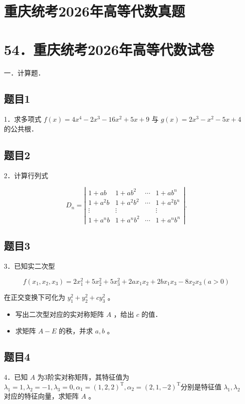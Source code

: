 \documentclass{article}
\begin{document}
\section*{重庆统考2026年高等代数真题}
\section*{54．重庆统考2026年高等代数试卷}
一．计算题．\\

\subsection{题目1}
1．求多项式 \(f(x)=4 x^{4}-2 x^{3}-16 x^{2}+5 x+9\) 与 \(g(x)=2 x^{3}-x^{2}-5 x+4\) 的公共根．

\subsection{题目2}
2．计算行列式

\[
D_{n}=\left|\begin{array}{cccc}
1+a b & 1+a b^{2} & \cdots & 1+a b^{n} \\
1+a^{2} b & 1+a^{2} b^{2} & \cdots & 1+a^{2} b^{n} \\
\vdots & \vdots & & \vdots \\
1+a^{n} b & 1+a^{n} b^{2} & \cdots & 1+a^{n} b^{n}
\end{array}\right| .
\]

\subsection{题目3}
3．已知实二次型

\[
f\left(x_{1}, x_{2}, x_{3}\right)=2 x_{1}^{2}+5 x_{2}^{2}+5 x_{3}^{2}+2 a x_{1} x_{2}+2 b x_{1} x_{3}-8 x_{2} x_{3}(a>0)
\]

在正交变换下可化为 \(y_{1}^{2}+y_{2}^{2}+c y_{3}^{2}\) 。

\begin{itemize}
  \item[（1）] 写出二次型对应的实对称矩阵 \(A\) ，给出 \(c\) 的值．
  \item[（2）] 求矩阵 \(A-E\) 的秩，并求 \(a, b\) 。
\end{itemize}

\subsection{题目4}
4．已知 \(A\) 为3阶实对称矩阵，其特征值为 \(\lambda_{1}=1, \lambda_{2}=-1, \lambda_{3}=0, \alpha_{1}=(1,2,2)^{\mathrm{T}}, \alpha_{2}=(2,1,-2)^{\mathrm{T}}\)分别是特征值 \(\lambda_{1}, \lambda_{2}\) 对应的特征向量，求矩阵 \(A\) 。
\end{document}

